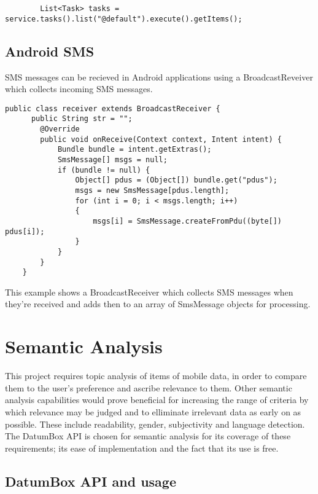 \lstset{language=Java, caption=Google Tasks example, label=GoogleTasksExample}
\begin{lstlisting}
    	List<Task> tasks = service.tasks().list("@default").execute().getItems();
\end{lstlisting}

\subsection{Android SMS}
SMS messages can be recieved in Android applications using a BroadcastReveiver which collects incoming SMS messages.

\lstset{language=Java, caption=Android SMS example, label=AndroidSMSExample}
\begin{lstlisting}
public class receiver extends BroadcastReceiver {
      public String str = "";
        @Override
        public void onReceive(Context context, Intent intent) {
            Bundle bundle = intent.getExtras();
            SmsMessage[] msgs = null;
            if (bundle != null) {
                Object[] pdus = (Object[]) bundle.get("pdus");
                msgs = new SmsMessage[pdus.length];
                for (int i = 0; i < msgs.length; i++) 
                {
                    msgs[i] = SmsMessage.createFromPdu((byte[]) pdus[i]);
                }
            }
        }
    }
\end{lstlisting}

This example shows a BroadcastReceiver which collects SMS messages when they're received and adds then to an array of SmsMessage objects for processing. 

\section{Semantic Analysis}

This project requires topic analysis of items of mobile data, in order to compare them to the user's preference and ascribe relevance to them. Other semantic analysis capabilities would prove beneficial for increasing the range of criteria by which relevance may be judged and to elliminate irrelevant data as early on as possible. These include readability, gender, subjectivity and language detection. The DatumBox API is chosen for semantic analysis for its coverage of these requirements; its ease of implementation and the fact that its use is free. 

\subsection{DatumBox API and usage}

